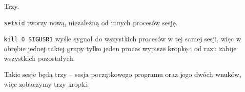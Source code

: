 Trzy.

\texttt{setsid} tworzy nową, niezależną od innych procesów sesję.

\texttt{kill 0 SIGUSR1} wyśle sygnał do wszystkich procesów w tej samej sesji, więc w obrębie jednej takiej
grupy tylko jeden proces wypisze kropkę i od razu zabije wszystkich pozostałych.

Takie sesje będą trzy -- sesja początkowego programu oraz jego dwóch wnuków, więc zobaczymy trzy kropki.